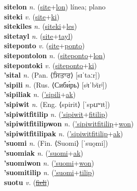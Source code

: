 \textbf{sitelon} \textit{n.} (\hyperref[site]{site}+\hyperref[lon]{lon})
línea; plano \label{sitelon} \\
\textbf{siteki} \textit{v.} (\hyperref[site]{site}+\hyperref[ki]{ki})
 \label{siteki} \\
\textbf{sitekiles} \textit{n.} (\hyperref[siteki]{siteki}+\hyperref[les]{les})
 \label{sitekiles} \\
\textbf{sitetayl} \textit{n.} (\hyperref[site]{site}+\hyperref[tayl]{tayl})
 \label{sitetayl} \\
\textbf{siteponto} \textit{v.} (\hyperref[site]{site}+\hyperref[ponto]{ponto})
 \label{siteponto} \\
\textbf{sitepontolon} \textit{n.} (\hyperref[siteponto]{siteponto}+\hyperref[lon]{lon})
 \label{sitepontolon} \\
\textbf{sitepontoki} \textit{v.} (\hyperref[siteponto]{siteponto}+\hyperref[ki]{ki})
 \label{sitepontoki} \\
\textbf{'sital} \textit{n.} (Pan. ⟨ਸਿਤਾਰ⟩ [sɪˈtaːr])
 \label{'sital} \\
\textbf{'sipili} \textit{n.} (Rus. ⟨Сиби́рь⟩ [sʲɪˈbʲirʲ])
 \label{'sipili} \\
\textbf{'sipiliak} \textit{n.} (\hyperref['sipili]{'sipili}+\hyperref[ak]{ak})
 \label{'sipiliak} \\
\textbf{'sipiwit} \textit{n.} (Eng. ⟨spirit⟩ [ˈspɪɹʷɪt])
 \label{'sipiwit} \\
\textbf{'sipiwitfitilip} \textit{n.} (\hyperref['sipiwit]{'sipiwit}+\hyperref[fitilip]{fitilip})
 \label{'sipiwitfitilip} \\
\textbf{'sipiwitfitilipwon} \textit{n.} (\hyperref['sipiwitfitilip]{'sipiwitfitilip}+\hyperref[won]{won})
 \label{'sipiwitfitilipwon} \\
\textbf{'sipiwitfitilipak} \textit{n.} (\hyperref['sipiwitfitilip]{'sipiwitfitilip}+\hyperref[ak]{ak})
 \label{'sipiwitfitilipak} \\
\textbf{'suomi} \textit{n.} (Fin. ⟨Suomi⟩ [ˈsuo̯mi])
 \label{'suomi} \\
\textbf{'suomiak} \textit{n.} (\hyperref['suomi]{'suomi}+\hyperref[ak]{ak})
 \label{'suomiak} \\
\textbf{'suomiwon} \textit{n.} (\hyperref['suomi]{'suomi}+\hyperref[won]{won})
 \label{'suomiwon} \\
\textbf{'suomitilip} \textit{n.} (\hyperref['suomi]{'suomi}+\hyperref[tilip]{tilip})
 \label{'suomitilip} \\
\textbf{suotu} \textit{v.} (\hyperref[fieli]{\sout{fieli}})
 \label{suotu} \\
